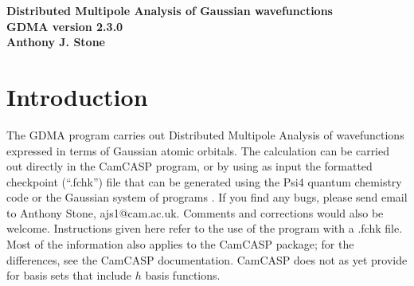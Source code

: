 \documentclass[12pt,txfonts]{paper}
\let\cite=\citep
\begin{document}
\begin{center}
\textbf{Distributed Multipole Analysis of Gaussian wavefunctions\\[3pt]
GDMA version 2.3.0\\[4 pt]
Anthony J. Stone}
\end{center}

\section{Introduction}

The GDMA program carries out Distributed Multipole Analysis of
wavefunctions expressed in terms of Gaussian atomic orbitals.
The calculation can be carried out directly in the CamCASP
program\cite{CamCASP5.9}, or
by using as input the formatted checkpoint (``.fchk'') file
that can be generated using the Psi4 quantum chemistry code\cite{psi4} or the
Gaussian system of programs\cite{Gaussian16}
.
If you find any bugs, please send email to Anthony
Stone, ajs1@cam.ac.uk. Comments and corrections would also be welcome.
Instructions given here refer to the use of the program with a .fchk file.
Most of the information also applies to the {\sc CamCASP} package; for
the differences, see the {\sc CamCASP} documentation. CamCASP does not
as yet provide for basis sets that include $h$ basis functions.
\end{document}
